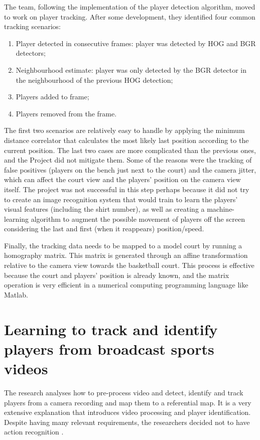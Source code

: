 \documentclass[
11pt,
twoside
]{report}
\begin{document}
The team, following the implementation of the player detection algorithm, moved to work on player tracking. After some development, they identified four common tracking scenarios:
\begin{enumerate}
\item Player detected in consecutive frames: player was detected by HOG and BGR detectors;
\item Neighbourhood estimate: player was only detected by the BGR detector in the neighbourhood of the previous HOG detection;
\item Players added to frame;
\item Players removed from the frame.
\end{enumerate}
The first two scenarios are relatively easy to handle by applying the minimum distance correlator that calculates the most likely last position according to the current position. The last two cases are more complicated than the previous ones, and the Project did not mitigate them. Some of the reasons were the tracking of false positives (players on the bench just next to the court) and the camera jitter, which can affect the court view and the players' position on the camera view itself. The project \cite{baskettrack} was not successful in this step perhaps because it did not try to create an image recognition system that would train to learn the players' visual features (including the shirt number), as well as creating a machine-learning algorithm to augment the possible movement of players off the screen considering the last and first (when it reappears) position/speed.


Finally, the tracking data needs to be mapped to a model court by running a homography matrix. This matrix is generated through an affine transformation relative to the camera view towards the basketball court. This process is effective because the court and players' position is already known, and the matrix operation is very efficient in a numerical computing programming language like Matlab.



\section{Learning to track and identify players from broadcast sports videos}


The research analyses how to pre-process video and detect, identify and track players from a camera recording and map them to a referential map. It is a very extensive explanation that introduces video processing and player identification. Despite having many relevant requirements, the researchers decided not to have action recognition \cite{learn_track_id}.
\end{document}
